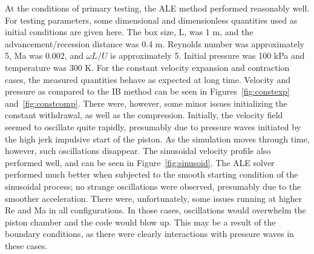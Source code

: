 \documentclass{article}
\begin{document}
At the conditions of primary testing, the ALE method performed reasonably well.  For testing parameters, some dimensional and dimensionless quantities used as initial conditions are given here.  The box size, L, was 1 m, and the advancement/recession distance was 0.4 m.  Reynolds number was approximately 5, Ma was 0.002, and $\omega L/U$ is approximately 5.  Initial pressure was 100 kPa and temperature was 300 K.  For the constant velocity expansion and contraction cases, the measured quantities behave as expected at long time.  Velocity and pressure as compared to the IB method can be seen in Figures~\ref{fig:constexp} and~\ref{fig:constcomp}.  There were, however, some minor issues initializing the constant withdrawal, as well as the compression.  Initially, the velocity field seemed to oscillate quite rapidly, presumably due to pressure waves initiated by the high jerk impulsive start of the piston.  As the simulation moves through time, however, such oscillations disappear.  The sinusoidal velocity profile also performed well, and can be seen in Figure~\ref{fig:sinusoid}.  The ALE solver performed much better when subjected to the smooth starting condition of the sinusoidal process; no strange oscillations were observed, presumably due to the smoother acceleration.  There were, unfortunately, some issues running at higher Re and Ma in all configurations. In those cases, oscillations would overwhelm the piston chamber and the code would blow up.  This may be a result of the boundary conditions, as there were clearly interactions with pressure waves in these cases.  
\end{document}
